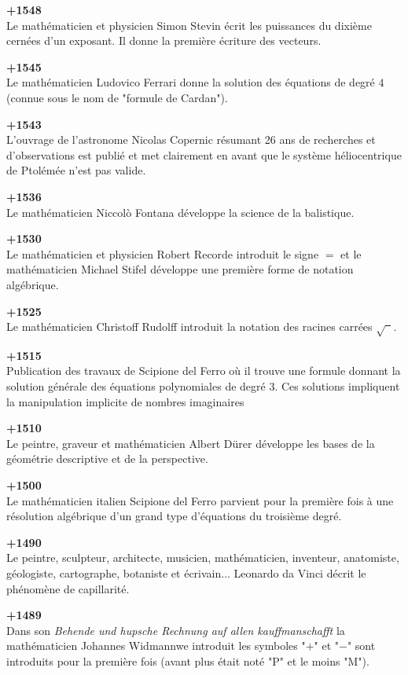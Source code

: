 \textbf{+1548}\\
Le mathématicien et physicien Simon Stevin écrit les puissances du dixième cernées d'un exposant. Il donne la première écriture des vecteurs. 

\textbf{+1545}\\
Le mathématicien Ludovico Ferrari donne la solution des équations de degré $4$ (connue sous le nom de "formule de Cardan").

\textbf{+1543}\\
L'ouvrage de l'astronome Nicolas Copernic résumant 26 ans de recherches et d'observations est publié et met clairement en avant que le système héliocentrique de Ptolémée n'est pas valide.

\textbf{+1536}\\
Le mathématicien Niccolò Fontana développe la science de la balistique.

\textbf{+1530}\\
Le mathématicien et physicien Robert Recorde introduit le signe $=$ et le mathématicien Michael Stifel développe une première forme de notation algébrique.

\textbf{+1525}\\
Le mathématicien Christoff Rudolff introduit la notation des racines carrées $\sqrt{\phantom{a}}$.

\textbf{+1515}\\
Publication des travaux de Scipione del Ferro où il trouve une formule donnant la solution générale des équations polynomiales de degré $ 3 $. Ces solutions impliquent la manipulation implicite de nombres imaginaires

\textbf{+1510}\\
Le peintre, graveur et mathématicien Albert Dürer développe les bases de la géométrie descriptive et de la perspective.

\textbf{+1500}\\
Le mathématicien italien Scipione del Ferro parvient pour la première fois à une résolution algébrique d'un grand type d'équations du troisième degré.

\textbf{+1490}\\
Le peintre, sculpteur, architecte, musicien, mathématicien, inventeur, anatomiste, géologiste, cartographe, botaniste et écrivain... Leonardo da Vinci décrit le phénomène de capillarité.

\textbf{+1489}\\
Dans son \textit{Behende und hupsche Rechnung auf allen kauffmanschafft} la mathématicien Johannes Widmannwe introduit les symboles "$ + $" et "$ - $" sont introduits pour la première fois (avant plus était noté "P" et le moins "M").

